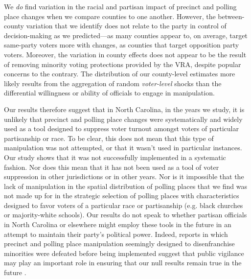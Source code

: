 \documentclass[12pt]{article}
\begin{document}
We \emph{do} find variation in the racial and partisan impact of precinct and polling place changes when we compare counties to one another. However, the between-county variation that we identify does not relate to the party in control of decision-making as we predicted---as many counties appear to, on average, target same-party voters more with changes, as counties that target opposition party voters.  Moreover, the variation in county effects does not appear to be the result of removing minority voting protections provided by the VRA, despite popular concerns to the contrary.  The distribution of our county-level estimates more likely results from the aggregation of random \emph{voter-level} shocks than the differential willingness or ability of officials to engage in manipulation.

Our results therefore suggest that in North Carolina, in the years we study, it is unlikely that precinct and polling place changes were systematically and widely used as a tool designed to suppress voter turnout amongst voters of particular partisanship or race.  To be clear, this does not mean that this type of manipulation was not attempted, or that it wasn't used in particular instances.  Our study shows that it was not successfully implemented in a systematic fashion.  Nor does this mean that it has not been used as a tool of voter suppression in other jurisdictions or in other years.  Nor is it impossible that the lack of manipulation in the spatial distribution of polling places that we find was not made up for in the strategic selection of polling places with characteristics designed to favor voters of a particular race or partisanship (e.g. black churches or majority-white schools).  Our results do not speak to whether partisan officials in North Carolina or elsewhere might employ these tools in the future in an attempt to maintain their party's political power.  Indeed, reports in which precinct and polling place manipulation seemingly designed to disenfranchise minorities were defeated before being implemented suggest that public vigilance may play an important role in ensuring that our null results remain true in the future \citep{Blackwell:2018uq}.
\end{document}
